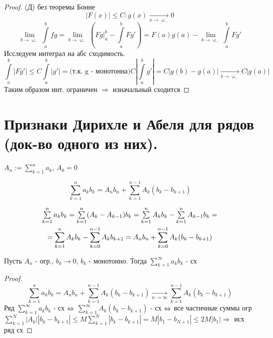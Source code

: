 \documentclass[12pt, fleqn]{article}
\begin{document}
\begin{Property}[3]
\begin{Property}[4]
\begin{Property}[2, аддитивность]
\begin{Proof}
\begin{proof}
    (Д) без теоремы Бонне
    \[|F(x)| \leqslant C: g(x) \underset{x \rightarrow \upomega_-}{\rightarrow} 0\]
    \[\lim\limits_{b \rightarrow \upomega_-} \int\limits_a^b f g = \lim\limits_{b \rightarrow \upomega_-} (F g |_a^b - \int\limits_a^b F g') = F(a) g(a) - \lim\limits_{b \rightarrow \upomega_-} \int\limits_a^b F g'\]
    Исследуем интеграл на абс сходимость. 
    \[\int\limits_a^b |F g'| \leqslant C \int\limits_a^b |g'| = \text{(т.к. g - монотонна)} C |\int\limits_a^b g'| = C |g(b) - g(a)| \underset{b \rightarrow \upomega_-}{\rightarrow} C |g(a)|\]
    Таким образом инт. ограничен $\Rightarrow$ изначальный сходится
\end{proof}

\newpage
\section{Признаки Дирихле и Абеля для рядов (док-во одного из них).}

\begin{definition}
    $A_n := \sum\limits_{k=1}^n a_k$, $A_0=0$
\end{definition}

\begin{Theorem} 
    \[\sum\limits_{k=1}^n a_k b_k = A_n b_n + \sum\limits_{k=1}^{n-1} A_k (b_k - b_{k+1})\]
\end{Theorem}

\begin{Proof}
    \begin{multline*}
        $$\sum\limits_{k=1}^n a_k b_k = \sum\limits_{k=1}^n (A_k - A_{k-1}) b_k = \sum\limits_{k=1}^n A_k b_k - \sum\limits_{k=1}^n A_{k-1} b_k =\\
        =\sum\limits_{k=1}^n A_k b_k - \sum\limits_{k=0}^{n-1} A_k b_{k+1} = A_n b_n + \sum\limits_{k=0}^{n-1} A_k (b_k - b_{k+1})$$
    \end{multline*}
\end{Proof}

\begin{theorem} 
    Пусть $A_n$ - огр., $b_k \rightarrow 0$, $b_k$ - монотонно. Тогда $\sum\limits_{k=1}^\infty a_k b_k$ - сх
\end{theorem}

\begin{proof}
    \[\sum\limits_{k=1}^n a_k b_k = A_n b_n + \sum\limits_{k=1}^{n-1} A_k (b_k - b_{k+1}) \underset{n \rightarrow \infty}{\rightarrow} \sum\limits_{k=1}^{n-1} A_k (b_k - b_{k+1})\]
    Ряд $\sum\limits_{k=1}^\infty a_k b_k$ - сх $\Leftrightarrow$ $\sum\limits_{k=1}^\infty A_k (b_k - b_{k+1})$ - сх $\Leftrightarrow$ все частичные суммы огр
    \\
    $\sum\limits_{k=1}^N |A_k| |b_k - b_{k+1}| \leqslant M \sum\limits_{k=1}^N |b_k - b_{k+1}| = M |b_1 - b_{N+1}| \leqslant 2 M |b_1| \Rightarrow$ исх ряд сх
\end{proof}


\end{Proof}
\end{Property}
\end{Property}
\end{Property}
\end{document}
